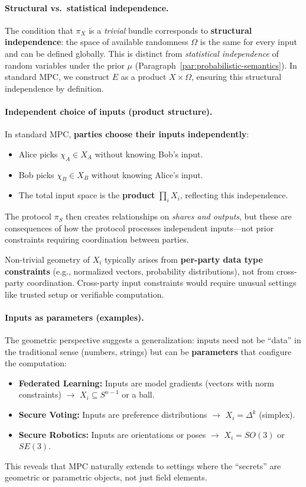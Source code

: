 \documentclass[11pt,a4paper]{article}
\theoremstyle{definition}
\theoremstyle{plain}
\begin{document}
\paragraph{Structural vs.\ statistical independence.}
The condition that $\pi_X$ is a \emph{trivial} bundle corresponds to \textbf{structural independence}: the space of available randomness $\Omega$ is the same for every input and can be defined globally.
This is distinct from \emph{statistical independence} of random variables under the prior $\mu$ (Paragraph~\ref{par:probabilistic-semantics}).
In standard MPC, we construct $E$ as a product $X\times \Omega$, ensuring this structural independence by definition.

\paragraph{Independent choice of inputs (product structure).}
In standard MPC, \textbf{parties choose their inputs independently}:
\begin{itemize}
    \item Alice picks $\chi_A \in X_A$ without knowing Bob's input.
    \item Bob picks $\chi_B \in X_B$ without knowing Alice's input.
    \item The total input space is the \textbf{product} $\prod_i X_i$, reflecting this independence.
\end{itemize}
The protocol $\pi_S$ then creates relationships on \emph{shares and outputs}, but these are consequences of how the protocol processes independent inputs---not prior constraints requiring coordination between parties.

Non-trivial geometry of $X_i$ typically arises from \textbf{per-party data type constraints} (e.g., normalized vectors, probability distributions), not from cross-party coordination. Cross-party input constraints would require unusual settings like trusted setup or verifiable computation.

\paragraph{Inputs as parameters (examples).}
The geometric perspective suggests a generalization: inputs need not be ``data'' in the traditional sense (numbers, strings) but can be \textbf{parameters} that configure the computation:
\begin{itemize}
    \item \textbf{Federated Learning:} Inputs are model gradients (vectors with norm constraints) $\to$ $X_i \subseteq S^{n-1}$ or a ball.
    \item \textbf{Secure Voting:} Inputs are preference distributions $\to$ $X_i = \Delta^k$ (simplex).
    \item \textbf{Secure Robotics:} Inputs are orientations or poses $\to$ $X_i = SO(3)$ or $SE(3)$.
\end{itemize}
This reveals that MPC naturally extends to settings where the ``secrets'' are geometric or parametric objects, not just field elements.
\end{document}

